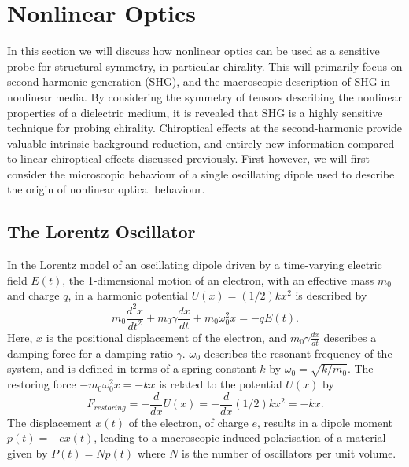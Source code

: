 \chapter{Nonlinear Optics}\label{sec:background:NonlinearOptics}

In this section we will discuss how nonlinear optics can be used as a sensitive probe for structural symmetry, in particular chirality. This will primarily focus on second-harmonic generation (SHG), and the macroscopic description of SHG in nonlinear media. By considering the symmetry of tensors describing the nonlinear properties of a dielectric medium, it is revealed that SHG is a highly sensitive technique for probing chirality. Chiroptical effects at the second-harmonic provide valuable intrinsic background reduction, and entirely new information compared to linear chiroptical effects discussed previously. First however, we will first consider the microscopic behaviour of a single oscillating dipole used to describe the origin of nonlinear optical behaviour.

\section{The Lorentz Oscillator}\label{sec:background:NonlinearOptics:lorentz}
In the Lorentz model of an oscillating dipole driven by a time-varying electric field $E(t)$, the 1-dimensional motion of an electron, with an effective mass $m_0$ and charge $q$, in a harmonic potential $U(x) = (1/2)kx^{2}$ is described by
\begin{equation}\label{eq:NonlinearOptics:eqMotion}
	m_{0} \frac{d^2 x}{dt^2} + m_{0} \gamma \frac{dx}{dt} + m_{0} \omega_{0}^2 x = -q E(t).
\end{equation}
Here, $x$ is the positional displacement of the electron, and $m_{0} \gamma \frac{dx}{dt}$ describes a damping force for a damping ratio $\gamma$. $\omega_{0}$ describes the resonant frequency of the system, and is defined in terms of a spring constant $k$ by $\omega_{0} = \sqrt{k/m_{0}}$. The restoring force $-m_{0} \omega_{0}^2 x = -kx$ is related to the potential $U(x)$ by
\begin{equation}
	F_{restoring} = -\frac{d}{dx} U(x) = -\frac{d}{dx} (1/2)kx^{2} = -kx.
\end{equation}
The displacement $x(t)$ of the electron, of charge $e$,  results in a dipole moment $p(t) = -ex(t)$, leading to a macroscopic induced polarisation of a material given by $P(t) = Np(t)$ where $N$ is the number of oscillators per unit volume.

